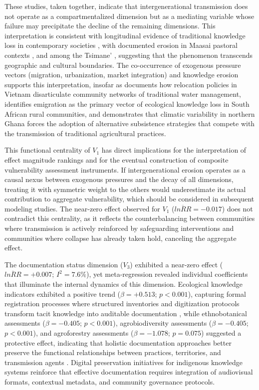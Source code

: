 \documentclass[12pt,a4paper]{article}
\begin{document}
These studies, taken together, indicate that intergenerational transmission does not operate as a compartmentalized dimension but as a mediating variable whose failure may precipitate the decline of the remaining dimensions. This interpretation is consistent with longitudinal evidence of traditional knowledge loss in contemporary societies \citep{ReyesGarcia2013evidence}, with documented erosion in Maasai pastoral contexts \citep{HedgesKipila2020}, and among the Tsimane' \citep{Gruberg2022}, suggesting that the phenomenon transcends geographic and cultural boundaries. The co-occurrence of exogenous pressure vectors (migration, urbanization, market integration) and knowledge erosion supports this interpretation, insofar as \citet{Tran2025} documents how relocation policies in Vietnam disarticulate community networks of traditional water management, \citet{Moller2023} identifies emigration as the primary vector of ecological knowledge loss in South African rural communities, and \citet{Aniah2019} demonstrates that climatic variability in northern Ghana forces the adoption of alternative subsistence strategies that compete with the transmission of traditional agricultural practices.

This functional centrality of $V_1$ has direct implications for the interpretation of effect magnitude rankings and for the eventual construction of composite vulnerability assessment instruments. If intergenerational erosion operates as a causal nexus between exogenous pressures and the decay of all dimensions, treating it with symmetric weight to the others would underestimate its actual contribution to aggregate vulnerability, which should be considered in subsequent modeling studies. The near-zero effect observed for $V_1$ ($\overline{lnRR} = -0.017$) does not contradict this centrality, as it reflects the counterbalancing between communities where transmission is actively reinforced by safeguarding interventions and communities where collapse has already taken hold, canceling the aggregate effect.

The documentation status dimension ($V_3$) exhibited a near-zero effect ($\overline{lnRR} = +0.007$; $I^2 = 7.6\%$), yet meta-regression revealed individual coefficients that illuminate the internal dynamics of this dimension. Ecological knowledge indicators exhibited a positive trend ($\beta = +0.513$; $p < 0.001$), capturing formal registration processes where structured inventories and digitization protocols transform tacit knowledge into auditable documentation \citep{Zeleke2025,Suwardi2025}, while ethnobotanical assessments ($\beta = -0.405$; $p < 0.001$), agrobiodiversity assessments ($\beta = -0.405$; $p < 0.001$), and agroforestry assessments ($\beta = -1.078$; $p = 0.075$) suggested a protective effect, indicating that holistic documentation approaches better preserve the functional relationships between practices, territories, and transmission agents \citep{Maina2012,Poorna2014}. Digital preservation initiatives for indigenous knowledge systems \citep{Balogun2021} reinforce that effective documentation requires integration of audiovisual formats, contextual metadata, and community governance protocols.
\end{document}

